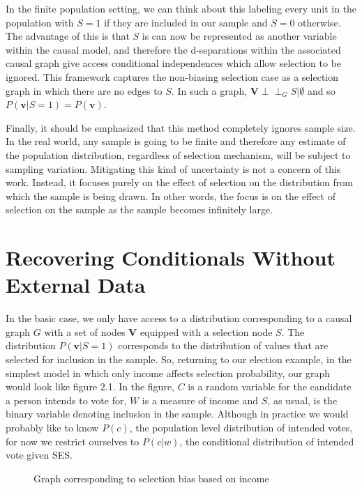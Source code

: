 \documentclass[12pt,twoside]{reedthesis}
\theoremstyle{definition}
\newcommand{\dsep}{\perp \!\!\!\perp}
\begin{document}
In the finite population setting, we can think about this labeling every unit in the population with  $S=1$ if they are included in our sample and $S= 0$ otherwise. The advantage of this is that $S$ is can now be represented as another variable within the causal model, and therefore the d-separations within the associated causal graph give access conditional independences which allow selection to be ignored. This framework captures the non-biasing selection case as a selection graph in which there are no edges to $S$. In such a graph, $\mathbf{V} \dsep_G S | \emptyset$ and so $P(\mathbf{v} | S = 1) = P(\mathbf{v})$.

Finally, it should be emphasized that this method completely ignores sample size. In the real world, any sample is going to be finite and therefore any estimate of the population distribution, regardless of selection mechanism, will be subject to sampling variation. Mitigating this kind of uncertainty is not a concern of this work. Instead, it focuses purely on the effect of selection on the distribution from which the sample is being drawn. In other words, the focus is on the effect of selection on the sample as the sample becomes infinitely large.


\section{Recovering Conditionals Without External Data}
In the basic case, we only have access to a distribution corresponding to a causal graph $G$  with a set of nodes $\mathbf{V}$ equipped with a selection node $S$. The distribution $P(\mathbf{v} | S = 1)$ corresponds to the distribution of values that are selected for inclusion in the sample. 
So, returning to our election example, in the simplest model in which only income affects selection probability, our graph would look like figure 2.1. In the figure, $C$ is a random variable for the candidate a person intends to vote for, $W$ is a measure of income and $S$, as usual, is the binary variable denoting inclusion in the sample. Although in practice we would probably like to know $P(c)$, the population level distribution of intended votes, for now we restrict ourselves to $P(c | w)$, the conditional distribution of intended vote given SES. 

\begin{figure}
\begin{center}
\end{center}
\caption{Graph corresponding to selection bias based on income} \label{fig:2.1}
\end{figure}
\end{document}
